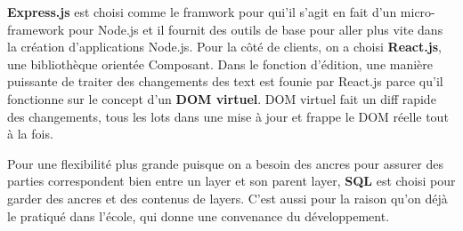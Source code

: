 \textbf{Express.js} est choisi comme le framwork pour qui'il s'agit en fait d'un micro-framework pour Node.js et il fournit des outils de base pour aller plus vite dans la création d'applications Node.js. Pour la côté de clients, on a choisi \textbf{React.js}, une bibliothèque orientée Composant. Dans le fonction d'édition, une manière puissante de traiter des changements des text est founie par React.js parce qu'il fonctionne sur le concept d'un \textbf{DOM virtuel}. DOM virtuel fait un diff rapide des changements, tous les lots dans une mise à jour et frappe le DOM réelle tout à la fois. 

Pour une flexibilité plus grande puisque on a besoin des ancres pour assurer des parties correspondent bien entre un layer et son parent layer, \textbf{SQL} est choisi pour garder des ancres et des contenus de layers. C'est aussi pour la raison qu'on déjà le pratiqué dans l'école, qui donne une convenance du développement. 